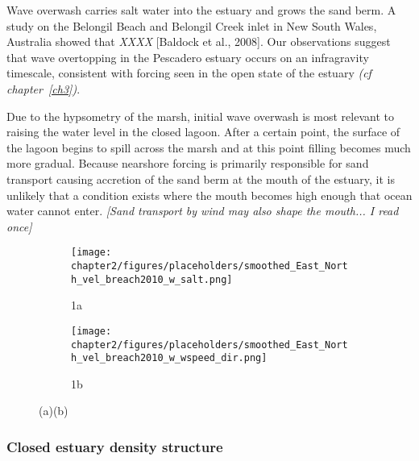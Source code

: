 Wave overwash carries salt water into the estuary and grows the sand berm. A study on the Belongil Beach and Belongil Creek inlet in New South Wales, Australia showed that \emph{XXXX} [Baldock et al., 2008]. Our observations suggest that wave overtopping in the Pescadero 
estuary occurs on an infragravity timescale, consistent with forcing seen in the open state of the estuary \emph{(cf chapter~\ref{ch3})}.

Due to the hypsometry of the marsh, initial wave overwash is most relevant to raising the water level in the closed lagoon. After a certain point, the surface of the lagoon begins to spill across the marsh and at this point filling becomes much more gradual. Because nearshore forcing is primarily responsible for sand transport causing accretion of the sand berm at the mouth of the estuary, it is unlikely that a condition exists where the mouth becomes high enough that ocean water cannot enter. \emph{[Sand transport by wind may also shape the mouth... I read once]}



\begin{figure}[t]
\begin{subfigure}{.5\textwidth}
	\centering
	\texttt{[image: chapter2/figures/placeholders/smoothed\_East\_North\_vel\_breach2010\_w\_salt.png]}
	\caption{1a}
	\label{fig:closed_UVwindsalta}
\end{subfigure}
\begin{subfigure}{.5\textwidth}
	\centering
	\texttt{[image: chapter2/figures/placeholders/smoothed\_East\_North\_vel\_breach2010\_w\_wspeed\_dir.png]}
	\caption{1b}
	\label{fig:closed_UVwindsaltb}
\end{subfigure}
\caption{(a)(b)}
\label{fig:close_UVwindsalt}
\end{figure}



\subsubsection{Closed estuary density structure} \label{cl_strat}



